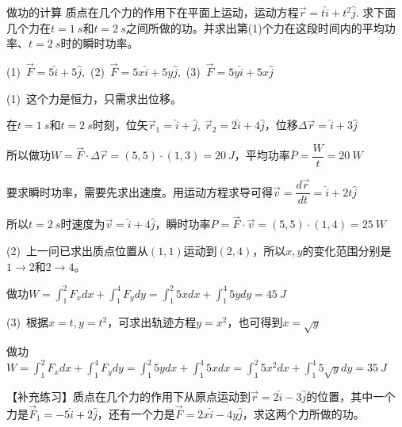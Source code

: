\begin{example}{做功的计算}  
    质点在几个力的作用下在平面上运动，运动方程$\vec{r}=t\hat{i}+t^2\hat{j}$. 求下面几个力在$t=\SI{1}{s}$和$t=\SI{2}{s}$之间所做的功。并求出第(1)个力在这段时间内的平均功率、$t=\SI{2}{s}$时的瞬时功率。

    (1)~$\vec{F}=5\hat{i}+5\hat{j}$,~(2)~$\vec{F}=5x\hat{i}+5y\hat{j}$,~(3)~$\vec{F}=5y\hat{i}+5x\hat{j}$

    \tcblower

    (1)~这个力是恒力，只需求出位移。
    
    在$t=\SI{1}{s}$和$t=\SI{2}{s}$时刻，位矢$\vec{r}_1=\hat{i}+\hat{j},~\vec{r}_2=2\hat{i}+4\hat{j}$，位移$\Delta \vec{r}=\hat{i}+3\hat{j}$

    \vspace{0.5em}

    所以做功$W=\vec{F}\cdot \Delta \vec{r}=(5,5)\cdot (1,3)=\SI{20}{J}$，平均功率$\bar{P}=\dfrac{W}{t}=\SI{20}{W}$

    \vspace{0.5em}

    要求瞬时功率，需要先求出速度。用运动方程求导可得$\vec{v}=\dfrac{d\vec{r}}{dt}=\hat{i}+2t\hat{j}$

    \vspace{0.2em}

    所以$t=\SI{2}{s}$时速度为$\vec{v}=\hat{i}+4\hat{j}$，瞬时功率$P=\vec{F}\cdot \vec{v}=(5,5)\cdot (1,4)=\SI{25}{W}$

    (2)~上一问已求出质点位置从$(1,1)$运动到$(2,4)$，所以$x,y$的变化范围分别是$1\rightarrow 2$和$2\rightarrow 4$。

    \vspace{0.3em}

    做功$W=\displaystyle\int_1^2{F_xdx}+\displaystyle\int_1^4{F_ydy}=\displaystyle\int_1^2{5xdx}+\displaystyle\int_1^4{5ydy}=\SI{45}{J}$

    \vspace{0.3em}

    (3)~根据$x=t,y=t^2$，可求出轨迹方程$y=x^2$，也可得到$x=\sqrt{y}$

    \vspace{0.3em}
    
    做功$W=\displaystyle\int_1^2{F_xdx}+\displaystyle\int_1^4{F_ydy}=\displaystyle\int_1^2{5ydx}+\displaystyle\int_1^4{5xdx}=\int_1^2{5x^2dx}+\displaystyle\int_1^4{5\sqrt{y}dy}=\SI{35}{J}$

    \tcbline

    【补充练习】质点在几个力的作用下从原点运动到$\vec{r}=2\hat{i}-3\hat{j}$的位置，其中一个力是$\vec{F}_1=-5\hat{i}+2\hat{j}$，还有一个力是$\vec{F}=2x\hat{i}-4y\hat{j}$，求这两个力所做的功。
\end{example}

